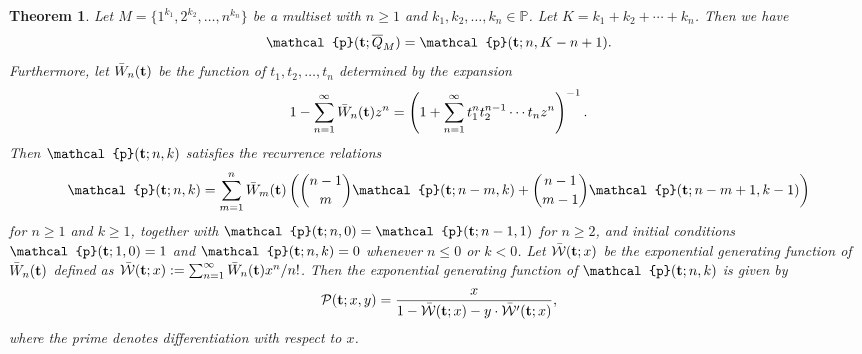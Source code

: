 \documentclass[11pt]{article}
\newcommand{\vt} { {\bf t}}
\numberwithin{equation}{section}
\newtheorem{thm}{Theorem}[section]
\def\cW{\mathcal{W}}
\def\cP{\mathcal{P}}
\def\oQ{\overline{Q}}
\newcommand{\cp}{\mathcal{p}}
\begin{document}
\begin{thm}\label{THM:enum-joint-pattern}
	Let $M=\{1^{k_1},2^{k_2},\ldots,n^{k_n}\}$ be a multiset with $n\geq 1$ and $k_1,k_2,\ldots,k_n\in\mathbb P$. Let 
	$K=k_1+k_2+\cdots +k_n$. Then we have
	\[
	\cp(\vt;\oQ_M)=\cp(\vt;n,K-n+1).
	\]
	Furthermore, let $ \bar{W}_n(\vt) $ be the function of $ t_1, t_2, \ldots, t_n $ determined by the expansion
	\begin{align}\label{EQ:barW_n}
	1 -\sum_{n=1}^{\infty} \bar{W}_n(\vt) z^n
	= \left( 1 + \sum_{n=1}^{\infty} t_1^nt_2^{n-1}\cdots t_n z^n \right)^{-1}.
	\end{align}
	Then $\cp(\vt;n,k)$ satisfies the recurrence relations
	\begin{align*}
	\cp(\vt;n,k)=%
	\sum_{m=1}^{n}\bar{W}_m(\vt)\left(\binom{n-1}{m}\cp(\vt;n-m,k)+\binom{n-1}{m-1}\cp(\vt;n-m+1,k-1)\right)
	\end{align*}
	for $n\geq1$ and $k\geq1$, together with $\cp(\vt;n,0)=\cp(\vt;n-1,1)$ for $n\geq2$,
	and initial conditions $\cp(\vt;1,0)=1$ and $\cp(\vt;n,k)=0$ whenever $n\leq0$ or $k<0$.
	Let $\bar{\cW}(\vt;x)$ be the exponential generating function of $\bar{W}_n(\vt)$ defined as
	$\bar{\cW}(\vt;x):=\sum_{n=1}^{\infty}\bar{W}_n(\vt)x^n/n!$.
	Then the exponential generating function of $\cp(\vt;n,k)$ is given by
	\begin{align*}
	\cP(\vt;x,y)=\frac{x}{1-\bar{\cW}(\vt;x)-y\cdot \bar{\cW}'(\vt;x)},
	\end{align*}
	where the prime denotes differentiation with respect to $x$.
\end{thm}
\end{document}
